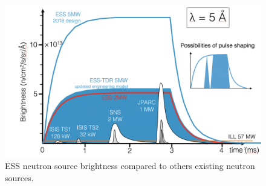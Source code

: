 \begin{figure}[!ht]
  \begin{center}
    \includegraphics[width=\textwidth]{02_BeamDiag/figures/fig000_ESS_pulse}

  \end{center}
  \caption[ESS neutron source brightness compared to others existing neutron sources]{ESS neutron source brightness compared to others existing neutron sources.}
  \label{chap3:fig:ESS_pulse}
\end{figure}
